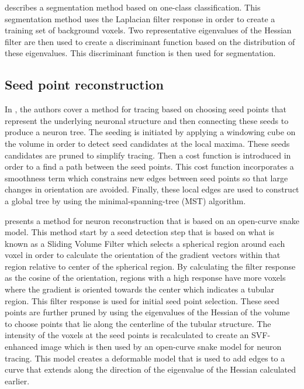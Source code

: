 \Textcite{Hernandez-Herrera2014} describes
a segmentation method based on one-class
classification. This segmentation method
uses the Laplacian filter response in
order to create a training set of
background voxels. Two representative
eigenvalues of the Hessian filter are then
used to create a discriminant function
based on the distribution of these
eigenvalues. This discriminant function is then used for
segmentation.

\subsection{Seed point reconstruction}

In \textcite{MICCAI-anisotropic-path-searching-Xie2010,MIA-anisotropic-path-searching-Xie2011},
the authors cover a method for tracing
based on choosing seed points that
represent the underlying neuronal
structure and then connecting these seeds
to produce a neuron tree. The seeding is
initiated by applying a windowing cube on
the volume in order to detect seed
candidates at the local maxima. These
seeds candidates are pruned to simplify
tracing. Then a cost function is
introduced in order to a find a path
between the seed points. This cost
function incorporates a smoothness term
which constrains new edges between seed
points so that large changes in
orientation are avoided. Finally, these
local edges are used to construct a
global tree by using the
minimal-spanning-tree (MST) algorithm.

\Textcite{Luo2015} presents a method for neuron
reconstruction that is based on an
open-curve snake model. This method
start by a seed detection step that is
based on what is known as a Sliding Volume
Filter which selects a spherical region
around each voxel in order to calculate
the orientation of the gradient vectors
within that region relative to center of
the spherical region. By calculating the
filter response as the cosine of the
orientation, regions with a high response
have more voxels where the gradient is
oriented towards the center which
indicates a tubular region. This filter
response is used for initial seed point
selection. These seed points are further
pruned by using the eigenvalues of the
Hessian of the volume to choose points
that lie along the centerline of the
tubular structure. The intensity of the
voxels at the seed points is recalculated to
create an SVF-enhanced image which is then
used by an open-curve snake model for
neuron tracing. This model creates a
deformable model that is used to add edges
to a curve that extends along the
direction of the eigenvalue of the Hessian
calculated earlier.

